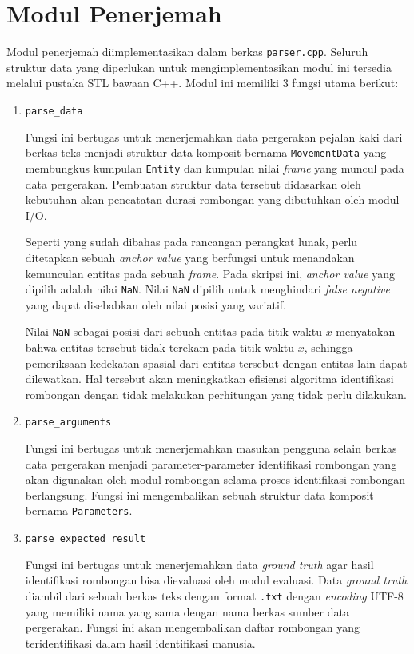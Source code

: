 \section{Modul Penerjemah}
\label{sec:impl-parser}

Modul penerjemah diimplementasikan dalam berkas \texttt{parser.cpp}. Seluruh struktur data yang diperlukan untuk mengimplementasikan modul ini tersedia melalui pustaka STL bawaan C++. Modul ini memiliki 3 fungsi utama berikut:

\begin{enumerate}
    \item \texttt{parse\_data}
    
    Fungsi ini bertugas untuk menerjemahkan data pergerakan pejalan kaki dari berkas teks menjadi struktur data komposit bernama \texttt{MovementData} yang membungkus kumpulan \texttt{Entity} dan kumpulan nilai \textit{frame} yang muncul pada data pergerakan. Pembuatan struktur data tersebut didasarkan oleh kebutuhan akan pencatatan durasi rombongan yang dibutuhkan oleh modul I/O.
    
    Seperti yang sudah dibahas pada rancangan perangkat lunak, perlu ditetapkan sebuah \textit{anchor value} yang berfungsi untuk menandakan kemunculan entitas pada sebuah \textit{frame}. Pada skripsi ini, \textit{anchor value} yang dipilih adalah nilai \texttt{NaN}. Nilai \texttt{NaN} dipilih untuk menghindari \textit{false negative} yang dapat disebabkan oleh nilai posisi yang variatif.

    Nilai \texttt{NaN} sebagai posisi dari sebuah entitas pada titik waktu $x$ menyatakan bahwa entitas tersebut tidak terekam pada titik waktu $x$, sehingga pemeriksaan kedekatan spasial dari entitas tersebut dengan entitas lain dapat dilewatkan. Hal tersebut akan meningkatkan efisiensi algoritma identifikasi rombongan dengan tidak melakukan perhitungan yang tidak perlu dilakukan. 
    
    \item \texttt{parse\_arguments}
    
    Fungsi ini bertugas untuk menerjemahkan masukan pengguna selain berkas data pergerakan menjadi parameter-parameter identifikasi rombongan yang akan digunakan oleh modul rombongan selama proses identifikasi rombongan berlangsung. Fungsi ini mengembalikan sebuah struktur data komposit bernama \texttt{Parameters}.
    
    \item \texttt{parse\_expected\_result}
    
    Fungsi ini bertugas untuk menerjemahkan data \textit{ground truth} agar hasil identifikasi rombongan bisa dievaluasi oleh modul evaluasi. Data \textit{ground truth} diambil dari sebuah berkas teks dengan format \texttt{.txt} dengan \textit{encoding} UTF-8 yang memiliki nama yang sama dengan nama berkas sumber data pergerakan. Fungsi ini akan mengembalikan daftar rombongan yang teridentifikasi dalam hasil identifikasi manusia.
\end{enumerate}


